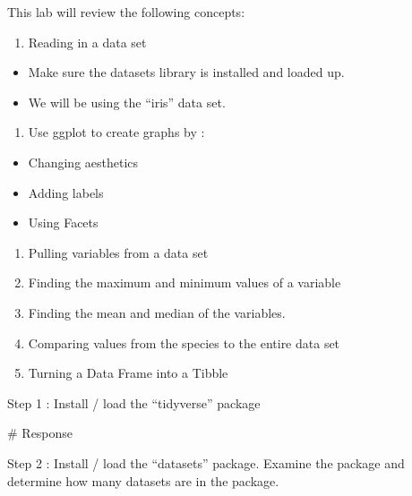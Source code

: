 \documentclass[
  letterpaper,
  DIV=11,
  numbers=noendperiod]{scrreprt}
\newenvironment{Shaded}{\begin{snugshade}}{\end{snugshade}}
\newcommand{\CommentTok}[1]{\textcolor[rgb]{0.37,0.37,0.37}{#1}}
\providecommand{\tightlist}{%
  \setlength{\itemsep}{0pt}\setlength{\parskip}{0pt}}\usepackage{longtable,booktabs,array}
\begin{document}
This lab will review the following concepts:

\begin{enumerate}
\def\labelenumi{\arabic{enumi}.}
\tightlist
\item
  Reading in a data set
\end{enumerate}

\begin{itemize}
\tightlist
\item
  Make sure the datasets library is installed and loaded up.
\item
  We will be using the ``iris'' data set.
\end{itemize}

\begin{enumerate}
\def\labelenumi{\arabic{enumi}.}
\setcounter{enumi}{1}
\tightlist
\item
  Use ggplot to create graphs by :
\end{enumerate}

\begin{itemize}
\tightlist
\item
  Changing aesthetics
\item
  Adding labels
\item
  Using Facets
\end{itemize}

\begin{enumerate}
\def\labelenumi{\arabic{enumi}.}
\setcounter{enumi}{2}
\tightlist
\item
  Pulling variables from a data set
\item
  Finding the maximum and minimum values of a variable
\item
  Finding the mean and median of the variables.
\item
  Comparing values from the species to the entire data set
\item
  Turning a Data Frame into a Tibble
\end{enumerate}

Step 1 : Install / load the ``tidyverse'' package

\begin{Shaded}
\begin{Highlighting}[]
\CommentTok{\# Response}
\end{Highlighting}
\end{Shaded}

Step 2 : Install / load the ``datasets'' package. Examine the package
and determine how many datasets are in the package.
\end{document}
